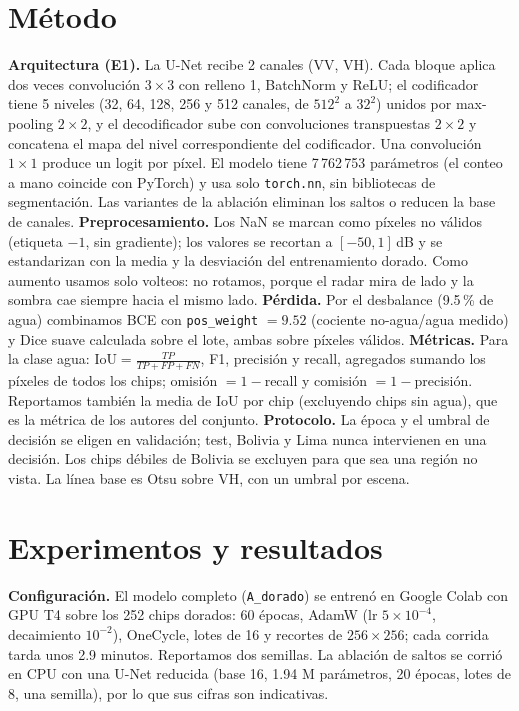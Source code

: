 \documentclass{article}
\begin{document}
\section{Método}
\textbf{Arquitectura (E1).} La U-Net recibe 2 canales (VV, VH). Cada bloque aplica dos veces convolución $3\times3$ con relleno 1, BatchNorm y ReLU; el codificador tiene 5 niveles (32, 64, 128, 256 y 512 canales, de $512^2$ a $32^2$) unidos por max-pooling $2\times2$, y el decodificador sube con convoluciones transpuestas $2\times2$ y concatena el mapa del nivel correspondiente del codificador. Una convolución $1\times1$ produce un logit por píxel. El modelo tiene 7\,762\,753 parámetros (el conteo a mano coincide con PyTorch) y usa solo \texttt{torch.nn}, sin bibliotecas de segmentación. Las variantes de la ablación eliminan los saltos o reducen la base de canales.
\textbf{Preprocesamiento.} Los NaN se marcan como píxeles no válidos (etiqueta $-1$, sin gradiente); los valores se recortan a $[-50,1]$\,dB y se estandarizan con la media y la desviación del entrenamiento dorado. Como aumento usamos solo volteos: no rotamos, porque el radar mira de lado y la sombra cae siempre hacia el mismo lado.
\textbf{Pérdida.} Por el desbalance (9.5\,\% de agua) combinamos BCE con \texttt{pos\_weight} $=9.52$ (cociente no-agua/agua medido) y Dice suave calculada sobre el lote, ambas sobre píxeles válidos.
\textbf{Métricas.} Para la clase agua: $\mathrm{IoU}=\frac{TP}{TP+FP+FN}$, F1, precisión y recall, agregados sumando los píxeles de todos los chips; omisión $=1-$recall y comisión $=1-$precisión. Reportamos también la media de IoU por chip (excluyendo chips sin agua), que es la métrica de los autores del conjunto.
\textbf{Protocolo.} La época y el umbral de decisión se eligen en validación; test, Bolivia y Lima nunca intervienen en una decisión. Los chips débiles de Bolivia se excluyen para que sea una región no vista. La línea base es Otsu sobre VH, con un umbral por escena.

\section{Experimentos y resultados}
\textbf{Configuración.} El modelo completo (\texttt{A\_dorado}) se entrenó en Google Colab con GPU T4 sobre los 252 chips dorados: 60 épocas, AdamW (lr $5\times10^{-4}$, decaimiento $10^{-2}$), OneCycle, lotes de 16 y recortes de $256\times256$; cada corrida tarda unos 2.9 minutos. Reportamos dos semillas. La ablación de saltos se corrió en CPU con una U-Net reducida (base 16, 1.94 M parámetros, 20 épocas, lotes de 8, una semilla), por lo que sus cifras son indicativas.
\end{document}
